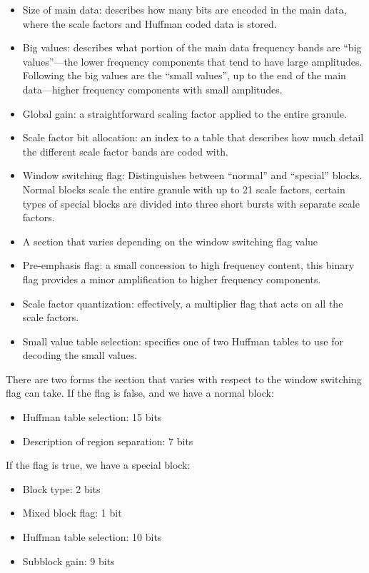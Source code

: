 \documentclass{thesis}
\begin{document}
\begin{itemize}
	\item Size of main data: describes how many bits are encoded in the main data, where the scale factors and Huffman coded data is stored.
	\item Big values: describes what portion of the main data frequency bands are ``big values''---the lower frequency components that tend to have large amplitudes. Following the big values are the ``small values'', up to the end of the main data---higher frequency components with small amplitudes.
	\item Global gain: a straightforward scaling factor applied to the entire granule.
	\item Scale factor bit allocation: an index to a table that describes how much detail the different scale factor bands are coded with.
	\item Window switching flag: Distinguishes between ``normal'' and ``special'' blocks. Normal blocks scale the entire granule with up to 21 scale factors, certain types of special blocks are divided into three short bursts with separate scale factors.
	\item A section that varies depending on the window switching flag value
	\item Pre-emphasis flag: a small concession to high frequency content, this binary flag provides a minor amplification to higher frequency components.
	\item Scale factor quantization: effectively, a multiplier flag that acts on all the scale factors.
	\item Small value table selection: specifies one of two Huffman tables to use for decoding the small values.
\end{itemize}

	There are two forms the section that varies with respect to the window switching flag can take. If the flag is false, and we have a normal block:
	
\begin{itemize}
	\item Huffman table selection: 15 bits
	\item Description of region separation: 7 bits
\end{itemize}

	If the flag is true, we have a special block:
	
\begin{itemize}
	\item Block type: 2 bits
	\item Mixed block flag: 1 bit
	\item Huffman table selection: 10 bits
	\item Subblock gain: 9 bits
\end{itemize}
\end{document}
